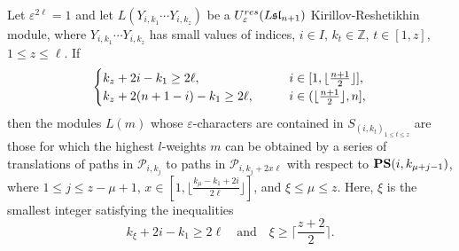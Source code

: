 \documentclass[10pt,a4paper]{amsart}
\newcommand{\ZZ}{\mathbb{Z}}
\newcommand{\res}{{\rm res}}
\begin{document}
\begin{lemma}\label{Lem: dominant monomial for k-r with z great }
Let $\varepsilon^{2 \ell}=1$ and let $L(Y_{i,k_1}\cdots Y_{i,k_z})$ be a $U_{\varepsilon}^{\res}({L\mathfrak{sl}_{n+1}})$ Kirillov-Reshetikhin module, where $Y_{i,k_1}\cdots Y_{i,k_z}$ has small values of indices, $i\in I$, $k_t\in\ZZ$, $t\in[1,z]$, $1\leq z\leq \ell$. If
\begin{align*}
\begin{cases} k_z+2i-k_1\geq 2 \ell, & {\hskip 2em} i\in [1, \lfloor \frac{n+1}2 \rfloor],\\
              k_z+2(n+1-i)-k_1\geq 2 \ell, & {\hskip 2em} i\in (\lfloor \frac{n+1}2 \rfloor, n],
\end{cases}
\end{align*}
then the modules $L(m)$ whose $\varepsilon$-characters are contained in $S_{(i,k_t)_{1 \leq t \leq z}}$ are those for which the highest $l$-weights $m$ can be obtained by a series of translations of paths in $\mathscr{P}_{i,k_j}$ to paths in $\mathscr{P}_{i,k_j+2x \ell}$ with respect to ${\bf PS}(i,k_{\mu+j-1})$, where $1\leq j\leq z-\mu+1$, $x\in[1, \lfloor\frac{k_\mu-k_1+2i}{2 \ell}\rfloor]$, and $\xi \leq \mu\leq z$. Here, $\xi$ is the smallest integer satisfying the inequalities
\[
k_\xi+2i-k_1\geq 2 \ell \quad\text{and}\quad \xi \geq \lceil \frac{z+2}2 \rceil.
\]
\end{lemma}
\end{document}
